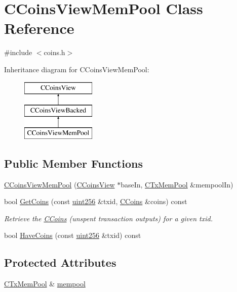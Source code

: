 \hypertarget{class_c_coins_view_mem_pool}{}\section{C\+Coins\+View\+Mem\+Pool Class Reference}
\label{class_c_coins_view_mem_pool}


{\ttfamily \#include $<$coins.\+h$>$}

Inheritance diagram for C\+Coins\+View\+Mem\+Pool\+:\begin{figure}[H]
\begin{center}
\leavevmode
\includegraphics[height=3.000000cm]{class_c_coins_view_mem_pool}
\end{center}
\end{figure}
\subsection*{Public Member Functions}
\begin{DoxyCompactItemize}
\item 
\hyperlink{class_c_coins_view_mem_pool_aab9a206c304acec322fddf646c7bafb9}{C\+Coins\+View\+Mem\+Pool} (\hyperlink{class_c_coins_view}{C\+Coins\+View} $\ast$base\+In, \hyperlink{class_c_tx_mem_pool}{C\+Tx\+Mem\+Pool} \&mempool\+In)
\item 
bool \hyperlink{class_c_coins_view_mem_pool_a01564f29ff2673ddd0d27414e576f1bc}{Get\+Coins} (const \hyperlink{classuint256}{uint256} \&txid, \hyperlink{class_c_coins}{C\+Coins} \&coins) const 
\begin{DoxyCompactList}\small\item\em Retrieve the \hyperlink{class_c_coins}{C\+Coins} (unspent transaction outputs) for a given txid. \end{DoxyCompactList}\item 
bool \hyperlink{class_c_coins_view_mem_pool_a965e6c8e378fe937620ba2c180d1ed74}{Have\+Coins} (const \hyperlink{classuint256}{uint256} \&txid) const 
\end{DoxyCompactItemize}
\subsection*{Protected Attributes}
\begin{DoxyCompactItemize}
\item 
\hyperlink{class_c_tx_mem_pool}{C\+Tx\+Mem\+Pool} \& \hyperlink{class_c_coins_view_mem_pool_a7a3870fc65376cb311a0b3abb28fec10}{mempool}
\end{DoxyCompactItemize}


